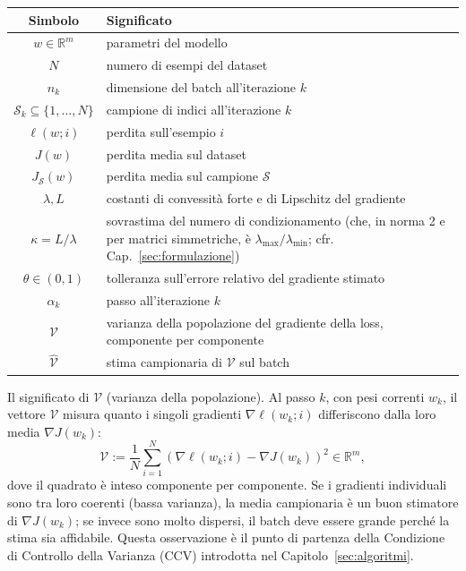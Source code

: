 \documentclass[italian, a4paper, twoside, binding=6mm]{sapthesis}
\newcommand{\R}{\mathbb{R}}
\begin{document}
\begin{center}
\renewcommand{\arraystretch}{1.4}
\begin{tabular}{>{\bfseries}c p{}}
\toprule
Simbolo & Significato \\
\midrule
$w \in \R^m$ & parametri del modello \\
$N$ & numero di esempi del dataset \\
$n_k$ & dimensione del batch all'iterazione $k$ \\
$\mathcal{S}_k \subseteq \{1,\dots,N\}$ & campione di indici all'iterazione $k$ \\
$\ell(w; i)$ & perdita sull'esempio $i$ \\
$J(w)$ & perdita media sul dataset \\
$J_{\mathcal{S}}(w)$ & perdita media sul campione $\mathcal{S}$ \\
$\lambda, L$ & costanti di convessità forte e di Lipschitz del gradiente \\
$\kappa = L/\lambda$ & sovrastima del numero di condizionamento (che, in norma 2 e per matrici simmetriche, è $\lambda_{\max}/\lambda_{\min}$; cfr. Cap.~\ref{sec:formulazione}) \\
$\theta \in (0,1)$ & tolleranza sull'errore relativo del gradiente stimato \\
$\alpha_k$ & passo all'iterazione $k$ \\
$\mathcal{V}$ & varianza della popolazione del gradiente della loss, componente per componente \\
$\widehat{\mathcal{V}}$ & stima campionaria di $\mathcal{V}$ sul batch \\
\bottomrule
\end{tabular}
\end{center}



\begin{notebox}
  Il significato di $\mathcal{V}$ (varianza della popolazione).
  Al passo $k$, con pesi correnti $w_k$, il vettore $\mathcal{V}$ misura
  quanto i singoli gradienti $\nabla \ell(w_k; i)$ differiscono dalla loro
  media $\nabla J(w_k)$:
  \[
  \mathcal{V} := \frac{1}{N} \sum_{i=1}^{N}
  \left( \nabla \ell(w_k; i) - \nabla J(w_k) \right)^2 \in \mathbb{R}^m,
  \]
  dove il quadrato è inteso componente per componente. Se i gradienti
  individuali sono tra loro coerenti (bassa varianza), la media campionaria è
  un buon stimatore di $\nabla J(w_k)$; se invece sono molto dispersi, il
  batch deve essere grande perché la stima sia affidabile. Questa osservazione
  è il punto di partenza della Condizione di Controllo della Varianza
  (CCV) introdotta nel Capitolo~\ref{sec:algoritmi}.
\end{notebox}
\end{document}
